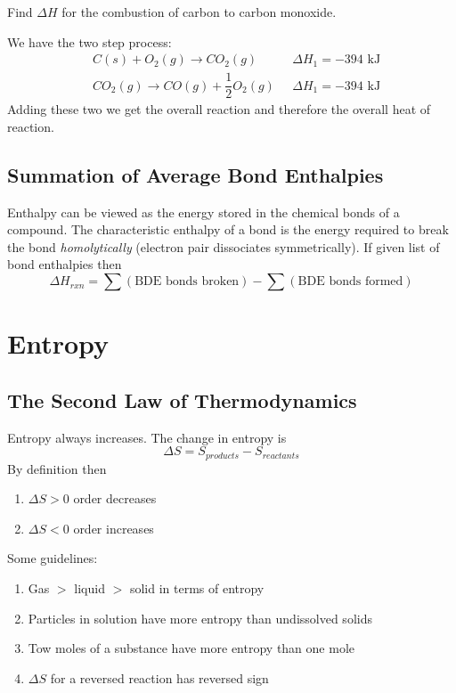 \documentclass[../GChemReview.tex]{subfiles}
\begin{document}
	\begin{problem*}
		Find $ \Delta H $ for the combustion of carbon to carbon monoxide.
	\end{problem*}
	
	We have the two step process:
	\begin{align*}
		&C(s) + O_{2}(g) \rightarrow CO_{2}(g) \qquad &\Delta H_{1}=-394\text{ kJ}\\
		&CO_{2}(g) \rightarrow CO(g) + \dfrac{1}{2}O_{2}(g)  &\Delta H_{1}=-394\text{ kJ}
	\end{align*}
	Adding these two we get the overall reaction and therefore the overall heat of reaction.
	
	\subsection{Summation of Average Bond Enthalpies}
	
	Enthalpy can be viewed as the energy stored in the chemical bonds of a compound. The characteristic enthalpy of a bond is the energy required to break the bond \emph{homolytically} (electron pair dissociates symmetrically). If given list of bond enthalpies then
	\begin{equation}
		\Delta H_{rxn} = \sum (\text{BDE bonds broken}) - \sum(\text{BDE bonds formed})
	\end{equation}
	
	\section{Entropy}
	
	\subsection{The Second Law of Thermodynamics}
	
	Entropy always increases. The change in entropy is
	\begin{equation}
		\Delta S = S_{products} - S_{reactants}
	\end{equation}
	By definition then
	\begin{enumerate}
		\item $ \Delta S > 0 $ order decreases
		\item $ \Delta S < 0 $ order increases
	\end{enumerate}
	Some guidelines:
	\begin{enumerate}
		\item Gas $ > $ liquid $ > $ solid in terms of entropy
		\item Particles in solution have more entropy than undissolved solids
		\item Tow moles of a substance have more entropy than one mole
		\item $ \Delta S $ for a reversed reaction has reversed sign
	\end{enumerate}
	
\end{document}
